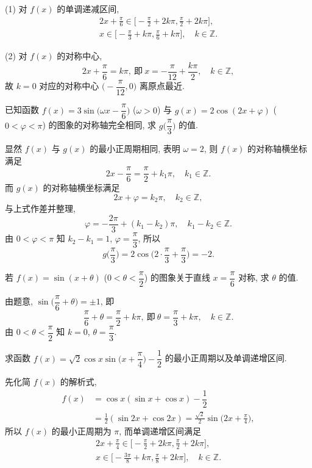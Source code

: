     (1) 对 $f(x)$ 的单调递减区间,
    \[\begin{gathered}
        2x+\frac\pi6\in \biggl[-\frac\pi2+2k\pi, 
            \frac\pi2+2k\pi\biggr],\\
        x\in \biggl[-\frac\pi3+k\pi, \frac\pi6+k\pi\biggr],\quad
            k\in\mathbb{Z}.
    \end{gathered}\]

    (2) 对 $f(x)$ 的对称中心,
    \[2x+\frac\pi6= k\pi,\ \text{即}\ 
        x= -\frac\pi{12}+\frac{k\pi}{2},\quad k\in\mathbb{Z},\]
    故 $k=0$ 对应的对称中心 $\biggl(-\dfrac\pi{12},0\biggr)$ 离原点最近.
\endsolution

\begin{example}
    已知函数 $f(x)=3\sin\Big(\omega x- \dfrac\pi6\Big)$ ($\omega>0$) 与 $g(x)=2\cos(2x+\varphi)$ ($0<\varphi<\pi$) 的图象的对称轴完全相同, 求 $g\Big(\dfrac\pi3\Big)$ 的值.
\end{example}
\beginsolution
    显然 $f(x)$ 与 $g(x)$ 的最小正周期相同, 表明 $\omega= 2$, 则 $f(x)$ 的对称轴横坐标满足 
    \[2x-\frac\pi6= \frac\pi2+ k_1\pi,\quad k_1\in\mathbb{Z}.\]
    而 $g(x)$ 的对称轴横坐标满足
    \[2x+\varphi= k_2\pi,\quad k_2\in\mathbb{Z},\]
    与上式作差并整理,
    \[\varphi= -\frac{2\pi}{3}+ (k_1-k_2)\pi,\quad 
        k_1-k_2\in\mathbb{Z}.\]
    由 $0<\varphi<\pi$ 知 $k_2-k_1=1$, $\varphi= \dfrac\pi3$, 所以
    \[g\Big(\dfrac\pi3\Big)
        = 2\cos\biggl(2\cdot\frac\pi3+ \frac\pi3\biggr)
        = -2.\]
\endsolution

\lianxi
\begin{exercise}
    若 $f(x)=\sin(x+\theta)$ ($0<\theta<\dfrac\pi2$) 的图象关于直线 $x= \dfrac\pi6$ 对称, 求 $\theta$ 的值.
\end{exercise}
\beginsolution
    由题意, $\sin\biggl(\dfrac\pi6+\theta\biggr)= \pm1$, 即
    \[\dfrac\pi6+\theta= \frac\pi2+ k\pi,\ \text{即}\ 
        \theta= \frac\pi3+ k\pi,\quad k\in\mathbb{Z}.\]
    由 $0<\theta<\dfrac\pi2$ 知 $k=0$, $\theta= \dfrac\pi3$.
\endsolution

\begin{exercise}
    求函数 $f(x)=\sqrt2\cos x\sin\Big(x+\dfrac{\pi}4\Big)-\dfrac12$ 的最小正周期以及单调递增区间.
\end{exercise}
\beginsolution
    先化简 $f(x)$ 的解析式,
    \[\begin{aligned}
        f(x)&= \cos x(\sin x+ \cos x)-\dfrac12\\
        &= \frac12(\sin2x+\cos2x)
         = \frac{\sqrt2}{2}\sin\biggl(2x+ \frac\pi4\biggr),
    \end{aligned}\]
    所以 $f(x)$ 的最小正周期为 $\pi$, 而单调递增区间满足
    \[\begin{gathered}
        2x+ \frac\pi4\in \biggl[-\frac\pi2+2k\pi, 
            \frac\pi2+2k\pi\biggr],\\
        x\in \biggl[-\frac{3\pi}8+k\pi, 
            \frac\pi8+2k\pi\biggr],\quad k\in\mathbb{Z}.
    \end{gathered}\]
\endsolution

